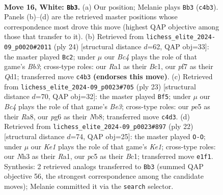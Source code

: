 \documentclass[11pt]{article}
\begin{document}
\clearpage

\begin{figure}[p]\centering
\begin{subfigure}{0.46\textwidth}\centering
\resizebox{\linewidth}{!}{%
\newchessgame
\chessboard[
  setfen={r1b1r1k1/2qn1pbp/p5p1/1ppPp1B1/2B1P3/2P4N/P4PPP/R1Q1K2R w - - 0 16},
  showmover=false,
  pgfstyle=straightmove, color=movearrow, markmove={c4-b3}
]}
\caption{}
\end{subfigure}\hfill
\begin{subfigure}{0.46\textwidth}\centering
\resizebox{\linewidth}{!}{%
\newchessgame
\chessboard[
  setfen={r1bqnrk1/3pbppp/p7/1p2P3/2pP4/1B6/PP3PPP/RNBQR1K1 w - - 0 13},
  showmover=false,
  pgfstyle=straightmove, color=movearrow, markmove={b3-c2}
]}
\caption{}
\end{subfigure}
\\[4pt]
\begin{subfigure}{0.46\textwidth}\centering
\resizebox{\linewidth}{!}{%
\newchessgame
\chessboard[
  setfen={rn1qkb1r/5pp1/p2pb3/3Pp2p/Pp6/6PP/1PP1NPB1/R1BQK2R b KQkq - 0 12},
  showmover=false,
  pgfstyle=straightmove, color=movearrow, markmove={e6-f5}
]}
\caption{}
\end{subfigure}\hfill
\begin{subfigure}{0.46\textwidth}\centering
\resizebox{\linewidth}{!}{%
\newchessgame
\chessboard[
  setfen={r1bqk2r/pp1pbppp/2p5/nP2P3/Q7/2pB1N2/P4PPP/R1B1K2R w KQkq - 0 12},
  showmover=false,
  pgfstyle=straightmove, color=movearrow, markmove={e1-g1}
]}
\caption{}
\end{subfigure}
\caption{\textbf{Move 16, White: \texttt{Bb3}.} (a) Our position; Melanie plays \texttt{Bb3} (\texttt{c4b3}). Panels (b)--(d) are the retrieved master positions whose correspondence most drove this move (highest QAP objective among those that transfer to it). (b) Retrieved from \texttt{lichess\_elite\_2024-09\_p0020\#2011} (ply 24) [structural distance $d$=62, QAP obj=33]: the master played \texttt{Bc2}; under $\mu$ our \emph{Bc4} plays the role of that game's \emph{Bb3}; cross-type roles: our \emph{R}a1 as their \emph{B}c1, our \emph{p}f7 as their \emph{Q}d1; transferred move \texttt{c4b3} \textbf{(endorses this move)}. (c) Retrieved from \texttt{lichess\_elite\_2024-09\_p0023\#705} (ply 23) [structural distance $d$=70, QAP obj=32]: the master played \texttt{Bf5}; under $\mu$ our \emph{Bc4} plays the role of that game's \emph{Be3}; cross-type roles: our \emph{p}e5 as their \emph{R}a8, our \emph{p}g6 as their \emph{N}b8; transferred move \texttt{c4d3}. (d) Retrieved from \texttt{lichess\_elite\_2024-09\_p0023\#897} (ply 22) [structural distance $d$=74, QAP obj=25]: the master played \texttt{O-O}; under $\mu$ our \emph{Ke1} plays the role of that game's \emph{Ke1}; cross-type roles: our \emph{N}h3 as their \emph{R}a1, our \emph{p}c5 as their \emph{B}c1; transferred move \texttt{e1f1}. Synthesis: 2 retrieved analogs transferred to \texttt{Bb3} (summed QAP objective 56, the strongest correspondence among the candidate moves); Melanie committed it via the \texttt{search} selector.}
\label{fig:thought-m30}
\end{figure}
\end{document}
